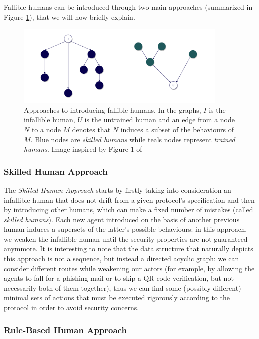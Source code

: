 \documentclass{article}
\begin{document}
Fallible humans can be introduced through two main approaches (summarized in Figure \ref{fig:fallible_humans}), that we will now briefly explain.

\begin{figure}[htbp]
    \centering
    \includegraphics[width=0.9\textwidth]{images/falliblehumans.png}
    \caption{Approaches to introducing fallible humans. In the graphs, $I$ is the infallible human, $U$ is the untrained human and an edge from a node $N$ to a node $M$ denotes that $N$ induces a subset of the behaviours of $M$. Blue nodes are \textit{skilled humans} while teals nodes represent \textit{trained humans}. Image inspired by Figure 1 of \cite{Basin_2016}}
    \label{fig:fallible_humans}
\end{figure}

\subsubsection{Skilled Human Approach}

The \textit{Skilled Human Approach} starts by firstly taking into consideration an infallible human that does not drift from a given protocol's specification and then by introducing other humans, which can make a fixed number of mistakes (called \textit{skilled humans}). Each new agent introduced on the basis of another previous human induces a supersets of the latter's possible behaviours: in this approach, we weaken the infallible human until the security properties are not guaranteed anymmore. It is interesting to note that the data structure that naturally depicts this approach is not a sequence, but instead a directed acyclic graph: we can consider different routes while weakening our actors (for example, by allowing the agents to fall for a phishing mail or to skip a QR code verification, but not necessarily both of them together), thus we can find some (possibly different) minimal sets of actions that must be executed rigorously according to the protocol in order to avoid security concerns.

\subsubsection{Rule-Based Human Approach}
\end{document}
